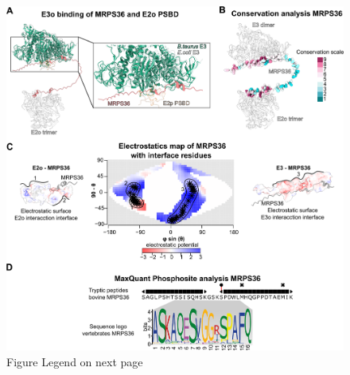 \begin{subappendices}
\begin{figure}[hbt]
        \includegraphics[]{Chapter.5/Figures/SI_Figure3.png}
        \caption{Figure Legend on next page}
        \label{fig:ch5_app_fig3}
    \end{figure}
    \addtocounter{figure}{-1}
    \begin{figure}[ht!]

\end{figure}
\end{subappendices}
